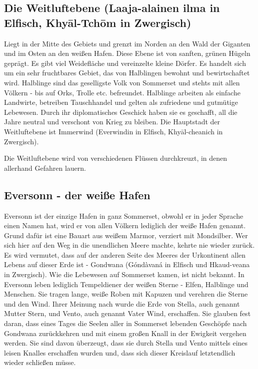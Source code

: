 \documentclass[11pt, twoside]{article}
\begin{document}
\subsection{Die Weitluftebene (Laaja-alainen ilma in Elfisch, Khyāl-Tchōm in Zwergisch)}
\label{sec:org9c04950}
Liegt in der Mitte des Gebiets und grenzt im Norden an den Wald der Giganten und im Osten an den weißen Hafen. Diese Ebene ist von sanften, grünen Hügeln geprägt. Es gibt viel Weidefläche und vereinzelte kleine Dörfer. Es handelt sich um ein sehr fruchtbares Gebiet, das von Halblingen bewohnt und bewirtschaftet wird. Halblinge sind das geselligste Volk von Sommerset und stehts mit allen Völkern - bis auf Orks, Trolle etc. befreundet. Halblinge arbeiten als einfache Landwirte, betreiben Tauschhandel und gelten als zufriedene und gutmütige Lebewesen. Durch ihr diplomatisches Geschick haben sie es geschafft, all die Jahre neutral und verschont von Krieg zu bleiben. Die Hauptstadt der Weitluftebene ist Immerwind (Everwindin in Elfisch, Khyāl-cheanich in Zwergisch).

Die Weitluftebene wird von verschiedenen Flüssen durchkreuzt, in denen allerhand Gefahren lauern.

\subsection{Eversonn - der weiße Hafen}
\label{sec:org7eb3829}
Eversonn ist der einzige Hafen in ganz Sommerset, obwohl er in jeder Sprache einen Namen hat, wird er von allen Völkern lediglich der weiße Hafen genannt. Grund dafür ist eine Bauart aus weißem Marmor, verziert mit Mondsilber. Wer sich hier auf den Weg in die unendlichen Meere machte, kehrte nie wieder zurück. Es wird vermutet, dass auf der anderen Seite des Meeres der Urkontinent allen Lebens auf dieser Erde ist - Gondwana (Góndàvaná in Elfisch und Hkaud-veana in Zwergisch). Wie die Lebewesen auf Sommerset kamen, ist nicht bekannt. In Eversonn leben lediglich Tempeldiener der weißen Sterne - Elfen, Halblinge und Menschen. Sie tragen lange, weiße Roben mit Kapuzen und verehren die Sterne und den Wind. Ihrer Meinung nach wurde die Erde von Stella, auch genannt Mutter Stern, und Vento, auch genannt Vater Wind, erschaffen. Sie glauben fest daran, dass eines Tages die Seelen aller in Sommerset lebenden Geschöpfe nach Gondwana zurückkehren und mit einem großen Knall in der Ewigkeit vergehen werden. Sie sind davon überzeugt, dass sie durch Stella und Vento mittels eines leisen Knalles erschaffen wurden und, dass sich dieser Kreislauf letztendlich wieder schließen müsse.
\end{document}
